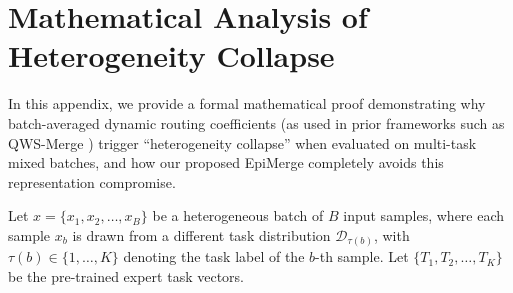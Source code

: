 \documentclass{article}
\theoremstyle{plain}
\theoremstyle{definition}
\theoremstyle{remark}
\begin{document}










\newpage
\appendix
\onecolumn
\section{Mathematical Analysis of Heterogeneity Collapse}
\label{app:heterogeneity_collapse}

In this appendix, we provide a formal mathematical proof demonstrating why batch-averaged dynamic routing coefficients (as used in prior frameworks such as QWS-Merge \cite{qws_merge}) trigger ``heterogeneity collapse'' when evaluated on multi-task mixed batches, and how our proposed EpiMerge completely avoids this representation compromise.

Let $x = \{x_1, x_2, \dots, x_B\}$ be a heterogeneous batch of $B$ input samples, where each sample $x_b$ is drawn from a different task distribution $\mathcal{D}_{\tau(b)}$, with $\tau(b) \in \{1, \dots, K\}$ denoting the task label of the $b$-th sample.
Let $\{T_1, T_2, \dots, T_K\}$ be the pre-trained expert task vectors.
\end{document}
